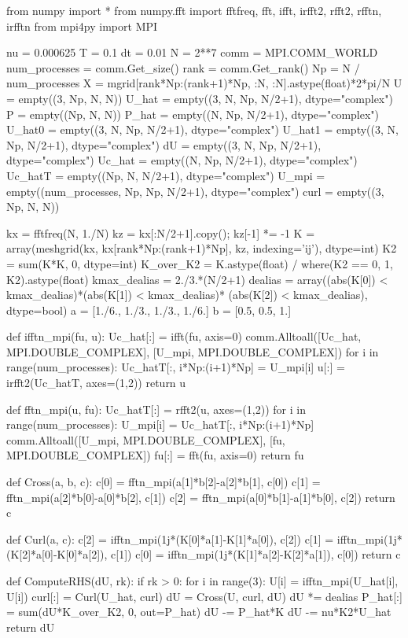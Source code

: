 \documentclass[11pt, oneside]{article}
\begin{document}
\begin{python}
from numpy import *
from numpy.fft import fftfreq, fft, ifft, irfft2, rfft2, rfftn, irfftn
from mpi4py import MPI

nu = 0.000625
T = 0.1
dt = 0.01
N = 2**7
comm = MPI.COMM_WORLD
num_processes = comm.Get_size()
rank = comm.Get_rank()
Np = N / num_processes
X = mgrid[rank*Np:(rank+1)*Np, :N, :N].astype(float)*2*pi/N
U     = empty((3, Np, N, N))
U_hat = empty((3, N, Np, N/2+1), dtype="complex")
P     = empty((Np, N, N))
P_hat = empty((N, Np, N/2+1), dtype="complex")
U_hat0  = empty((3, N, Np, N/2+1), dtype="complex")
U_hat1  = empty((3, N, Np, N/2+1), dtype="complex")
dU      = empty((3, N, Np, N/2+1), dtype="complex")
Uc_hat  = empty((N, Np, N/2+1), dtype="complex")
Uc_hatT = empty((Np, N, N/2+1), dtype="complex")
U_mpi   = empty((num_processes, Np, Np, N/2+1), dtype="complex")
curl    = empty((3, Np, N, N))

kx = fftfreq(N, 1./N)
kz = kx[:N/2+1].copy(); kz[-1] *= -1
K = array(meshgrid(kx, kx[rank*Np:(rank+1)*Np], kz, indexing='ij'), dtype=int)
K2 = sum(K*K, 0, dtype=int)
K_over_K2 = K.astype(float) / where(K2 == 0, 1, K2).astype(float)
kmax_dealias = 2./3.*(N/2+1)
dealias = array((abs(K[0]) < kmax_dealias)*(abs(K[1]) < kmax_dealias)*
                (abs(K[2]) < kmax_dealias), dtype=bool)
a = [1./6., 1./3., 1./3., 1./6.]
b = [0.5, 0.5, 1.]

def ifftn_mpi(fu, u):
    Uc_hat[:] = ifft(fu, axis=0)
    comm.Alltoall([Uc_hat, MPI.DOUBLE_COMPLEX], [U_mpi, MPI.DOUBLE_COMPLEX])
    for i in range(num_processes):
        Uc_hatT[:, i*Np:(i+1)*Np] = U_mpi[i]
    u[:] = irfft2(Uc_hatT, axes=(1,2))
    return u

def fftn_mpi(u, fu):
    Uc_hatT[:] = rfft2(u, axes=(1,2))
    for i in range(num_processes):
        U_mpi[i] = Uc_hatT[:, i*Np:(i+1)*Np]
    comm.Alltoall([U_mpi, MPI.DOUBLE_COMPLEX], [fu, MPI.DOUBLE_COMPLEX])
    fu[:] = fft(fu, axis=0)
    return fu

def Cross(a, b, c):
    c[0] = fftn_mpi(a[1]*b[2]-a[2]*b[1], c[0])
    c[1] = fftn_mpi(a[2]*b[0]-a[0]*b[2], c[1])
    c[2] = fftn_mpi(a[0]*b[1]-a[1]*b[0], c[2])
    return c

def Curl(a, c):
    c[2] = ifftn_mpi(1j*(K[0]*a[1]-K[1]*a[0]), c[2])
    c[1] = ifftn_mpi(1j*(K[2]*a[0]-K[0]*a[2]), c[1])
    c[0] = ifftn_mpi(1j*(K[1]*a[2]-K[2]*a[1]), c[0])
    return c

def ComputeRHS(dU, rk):
    if rk > 0:
        for i in range(3):
            U[i] = ifftn_mpi(U_hat[i], U[i])
    curl[:] = Curl(U_hat, curl)
    dU = Cross(U, curl, dU)
    dU *= dealias
    P_hat[:] = sum(dU*K_over_K2, 0, out=P_hat)
    dU -= P_hat*K
    dU -= nu*K2*U_hat
    return dU


\end{python}
\end{document}
